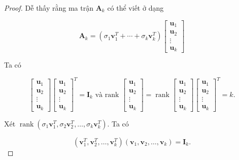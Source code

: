 \documentclass[12pt,a4paper,oneside]{report}
\numberwithin{equation}{section}
\begin{document}
\begin{proof}
Dễ thấy rằng ma trận $\mathbf{A}_{k}$ có thể viết ở dạng

$$
\mathbf{A}_{k}=\left(\sigma_{1} \mathbf{v}_{1}^{T}+\cdots+\sigma_{k} \mathbf{v}_{k}^{T}\right)\left[\begin{array}{c}
	\mathbf{u}_{1} \\
	\mathbf{u}_{2} \\
	\vdots \\
	\mathbf{u}_{k}
\end{array}\right]
$$

Ta có

$$
\left[\begin{array}{c}
	\mathbf{u}_{1} \\
	\mathbf{u}_{2} \\
	\vdots \\
	\mathbf{u}_{k}
\end{array}\right]\left[\begin{array}{c}
	\mathbf{u}_{1} \\
	\mathbf{u}_{2} \\
	\vdots \\
	\mathbf{u}_{k}
\end{array}\right]^{T}=\mathbf{I}_{k} \text { và rank }\left[\begin{array}{c}
	\mathbf{u}_{1} \\
	\mathbf{u}_{2} \\
	\vdots \\
	\mathbf{u}_{k}
\end{array}\right]=\operatorname{rank}\left[\begin{array}{c}
	\mathbf{u}_{1} \\
	\mathbf{u}_{2} \\
	\vdots \\
	\mathbf{u}_{k}
\end{array}\right]\left[\begin{array}{c}
	\mathbf{u}_{1} \\
	\mathbf{u}_{2} \\
	\vdots \\
	\mathbf{u}_{k}
\end{array}\right]^{T}=k .
$$

Xét $\operatorname{rank}\left(\sigma_{1} \mathbf{v}_{1}^{T}, \sigma_{2} \mathbf{v}_{2}^{T}, \ldots, \sigma_{k} \mathbf{v}_{k}^{T}\right)$. Ta có

$$
\left(\mathbf{v}_{1}^{T}, \mathbf{v}_{2}^{T}, \ldots, \mathbf{v}_{k}^{T}\right)\left(\mathbf{v}_{1}, \mathbf{v}_{2}, \ldots, \mathbf{v}_{k}\right)=\mathbf{I}_{k}. 
$$


\end{proof}
\end{document}
